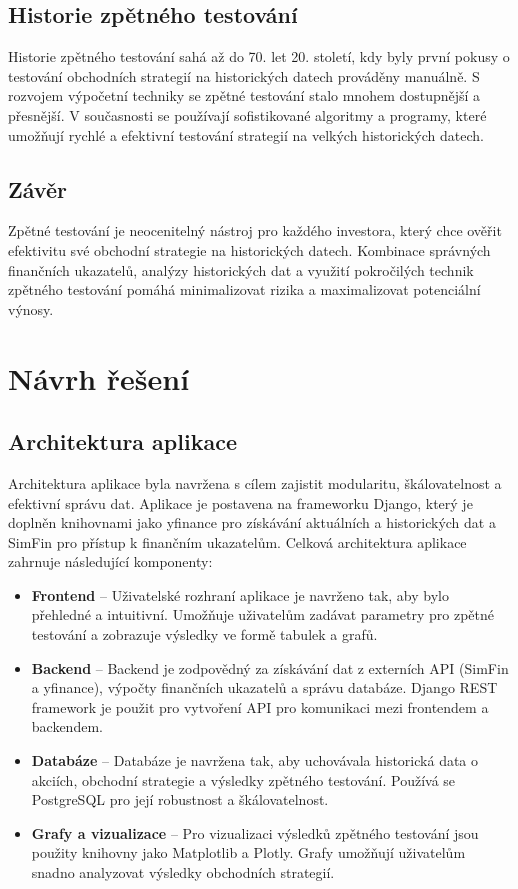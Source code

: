 \documentclass[12pt, a4paper]{report}
\begin{document}
\section{Historie zpětného testování}


Historie zpětného testování sahá až do 70. let 20. století, kdy byly první pokusy o testování obchodních strategií na historických datech prováděny manuálně. S rozvojem výpočetní techniky se zpětné testování stalo mnohem dostupnější a přesnější. V současnosti se používají sofistikované algoritmy a programy, které umožňují rychlé a efektivní testování strategií na velkých historických datech.

\section{Závěr}


Zpětné testování je neocenitelný nástroj pro každého investora, který chce ověřit efektivitu své obchodní strategie na historických datech. Kombinace správných finančních ukazatelů, analýzy historických dat a využití pokročilých technik zpětného testování pomáhá minimalizovat rizika a maximalizovat potenciální výnosy.

\chapter{Návrh řešení}


\section{Architektura aplikace}


Architektura aplikace byla navržena s cílem zajistit modularitu, škálovatelnost a efektivní správu dat. Aplikace je postavena na frameworku Django, který je doplněn knihovnami jako yfinance pro získávání aktuálních a historických dat a SimFin pro přístup k finančním ukazatelům. Celková architektura aplikace zahrnuje následující komponenty:

\begin{itemize}
    \item \textbf{Frontend} – Uživatelské rozhraní aplikace je navrženo tak, aby bylo přehledné a intuitivní. Umožňuje uživatelům zadávat parametry pro zpětné testování a zobrazuje výsledky ve formě tabulek a grafů.
    \item \textbf{Backend} – Backend je zodpovědný za získávání dat z externích API (SimFin a yfinance), výpočty finančních ukazatelů a správu databáze. Django REST framework je použit pro vytvoření API pro komunikaci mezi frontendem a backendem.
    \item \textbf{Databáze} – Databáze je navržena tak, aby uchovávala historická data o akciích, obchodní strategie a výsledky zpětného testování. Používá se PostgreSQL pro její robustnost a škálovatelnost.
    \item \textbf{Grafy a vizualizace} – Pro vizualizaci výsledků zpětného testování jsou použity knihovny jako Matplotlib a Plotly. Grafy umožňují uživatelům snadno analyzovat výsledky obchodních strategií.
\end{itemize}
\end{document}
